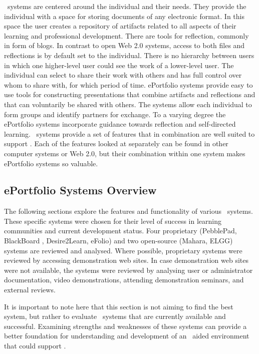 \ep~systems are centered around the individual and their needs. They provide the
individual with a space for storing documents of any electronic format. In this
space the user creates a repository of artifacts related to all aspects of their
learning and professional development. There are tools for reflection, commonly
in form of blogs. In contrast to open Web 2.0 systems, access to both files and
reflections is by default set to the individual. There is no hierarchy between
users in which one higher-level user could see the work of a lower-level user.
The individual can select to share their work with others and has full control
over whom to share with, for which period of time. ePortfolio systems provide
easy to use tools for constructing presentations that combine artifacts and
reflections and that can voluntarily be shared with others. The systems allow
each individual to form groups and identify partners for exchange. To a varying
degree the ePortfolio systems incorporate guidance towards reflection and
self-directed learning. \ep~systems provide a set of features that in
combination are well suited to support \LLLsn. Each of the features looked at
separately can be found in other computer systems or Web 2.0, but their
combination within one system makes ePortfolio systems so valuable.

\subsection{ePortfolio Systems Overview}
The following sections explore the features and functionality of various
\ep~systems. These specific systems were chosen for their level of success in
learning communities and current development status. Four proprietary
(PebblePad, BlackBoard \ep, Desire2Learn, eFolio) and two open-source (Mahara,
ELGG) systems are reviewed and analysed. Where possible, proprietary systems
were reviewed by accessing demonstration web sites. In case demonstration web
sites were not available, the systems were reviewed by analysing user or
administrator documentation, video demonstrations, attending demonstration
seminars, and external reviews.

It is important to note here that this section is not aiming to find the best
system, but rather to evaluate \ep~systems that are currently available and
successful. Examining strengths and weaknesses of these systems can provide a
better foundation for understanding and development of an \ep~aided environment
that could support \LLLsn.


